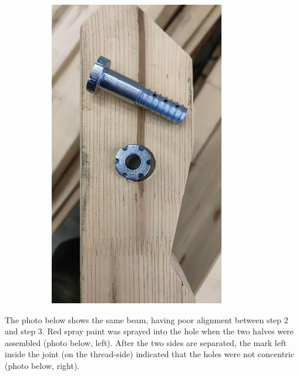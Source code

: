 \documentclass[11pt]{book}
\begin{document}
\begin{figure}[H]
\begin{subfigure}[b]{0.45\textwidth}
\end{subfigure}
\hfill
\begin{subfigure}[b]{0.45\textwidth}
\centering
\includegraphics[width=\textwidth]{./images/image86.jpeg}
\end{subfigure}
\end{figure}


The photo below shows the same beam, having poor alignment between step 2 and step 3. Red spray paint was sprayed into the hole when the two halves were assembled (photo below, left). After the two sides are separated, the mark left inside the joint (on the thread-side) indicated that the holes were not concentric (photo below, right).
\end{document}
